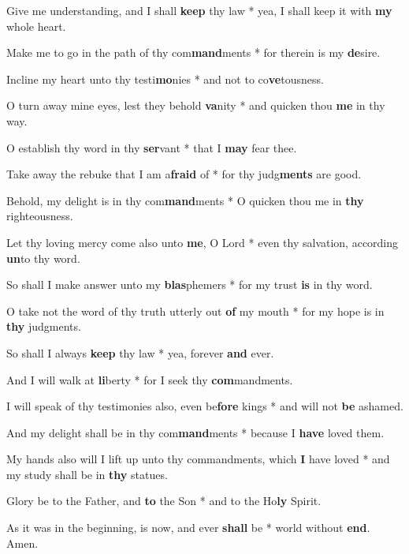 \begin{multicols}{2}
	Give me understanding, and I shall \textbf{keep} thy law * yea, I shall keep it with \textbf{my} whole heart.
	
	Make me to go in the path of thy com\textbf{mand}ments * for therein is my \textbf{de}sire.
	
	Incline my heart unto thy testi\textbf{mo}nies * and not to co\textbf{ve}tousness.
	
	O turn away mine eyes, lest they behold \textbf{va}nity * and quicken thou \textbf{me} in thy way.
	
	O establish thy word in thy \textbf{ser}vant * that I \textbf{may} fear thee.
	
	Take away the rebuke that I am a\textbf{fraid} of * for thy judg\textbf{ments} are good.
	
	Behold, my delight is in thy com\textbf{mand}ments * O quicken thou me in \textbf{thy} righteousness.
	
	Let thy loving mercy come also unto \textbf{me}, O Lord * even thy salvation, according \textbf{un}to thy word.
	
	So shall I make answer unto my \textbf{blas}phemers * for my trust \textbf{is} in thy word.
	
	O take not the word of thy truth utterly out \textbf{of} my mouth * for my hope is in \textbf{thy} judgments.
	
	So shall I always \textbf{keep} thy law * yea, forever \textbf{and} ever.
	
	And I will walk at \textbf{li}berty * for I seek thy \textbf{com}mandments.
	
	I will speak of thy testimonies also, even be\textbf{fore} kings * and will not \textbf{be} ashamed.
	
	And my delight shall be in thy com\textbf{mand}ments * because I \textbf{have} loved them.
	
	My hands also will I lift up unto thy commandments, which \textbf{I} have loved * and my study shall be in \textbf{thy} statues.
	
	Glory be to the Father, and \textbf{to} the Son * and to the Ho\textbf{ly} Spirit.
	
	As it was in the beginning, is now, and ever \textbf{shall} be * world without \textbf{end}. Amen.
\end{multicols}